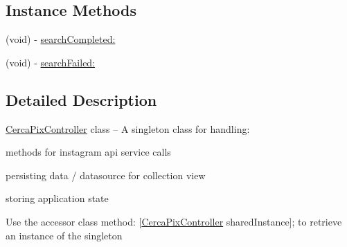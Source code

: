 \subsection*{Instance Methods}
\begin{DoxyCompactItemize}
\item 
(void) -\/ \hyperlink{protocol_cerca_pix_controller_delegate-p_a0e84878044700ac29b7e23680a7ba1b5}{search\-Completed\-:}
\item 
(void) -\/ \hyperlink{protocol_cerca_pix_controller_delegate-p_a1121695268652d83ccf2977e2c2f219c}{search\-Failed\-:}
\end{DoxyCompactItemize}


\subsection{Detailed Description}
\hyperlink{interface_cerca_pix_controller}{Cerca\-Pix\-Controller} class -- A singleton class for handling\-:


\begin{DoxyItemize}
\item methods for instagram api service calls
\item persisting data / datasource for collection view
\item storing application state
\end{DoxyItemize}

Use the accessor class method\-: \mbox{[}\hyperlink{interface_cerca_pix_controller}{Cerca\-Pix\-Controller} shared\-Instance\mbox{]}; to retrieve an instance of the singleton 

